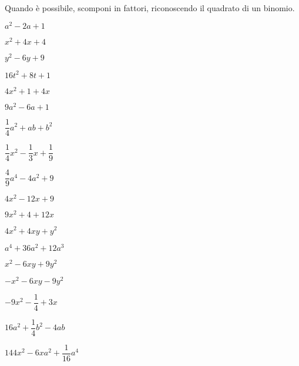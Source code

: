\paragraph*{}

\begin{esercizio}
\label{ese:div.020}
Quando è possibile, scomponi in fattori, riconoscendo il quadrato di un binomio.
\begin{multicols}{3}
\begin{enumeratea}
 \item $a^{2}-2a+1$
 \item $x^{2}+4x+4$
 \item $y^{2}-6y+9$
 \item $16t^{2}+8t+1$
 \item $4x^{2}+1+4x$
 \item $9a^{2}-6a+1$
 \item $\dfrac{1}{4}a^{2}+ab+b^{2}$
 \item $\dfrac{1}{4}x^{2}-\dfrac{1}{3}x+\dfrac{1}{9}$
 \item $\dfrac{4}{9}a^{{4}}-4a^{2}+9$
 \item $4x^{2}-12x+9$
 \item $9x^{2}+4+12x$
 \item $4x^{2}+4xy+y^{2}$
 \item $a^{4}+36a^{2}+12a^{3}$
 \item $x^{2}-6xy+9y^{2}$
 \item $-x^{2}-6xy-9y^{2}$
 \item $-9x^{2}-\dfrac{1}{4}+3x$
 \item $16a^{2}+\dfrac{1}{4}b^{2}-4ab$
 \item $144x^{2}-6xa^{2}+\dfrac{1}{16}a^{4}$
\end{enumeratea}
\end{multicols}
\end{esercizio}

